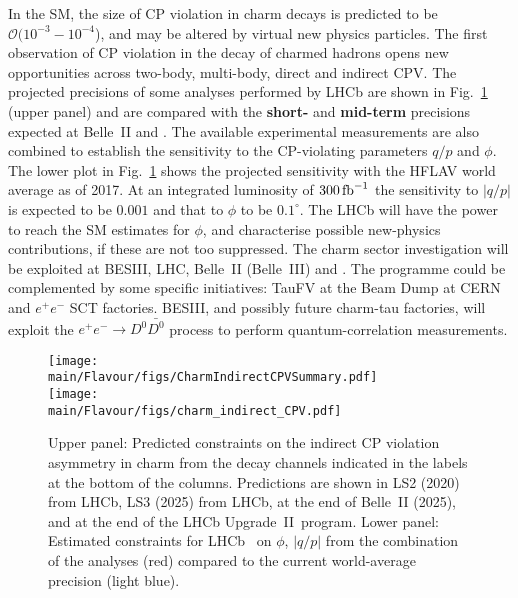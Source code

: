 In the SM, the size of CP violation in charm decays is predicted  to be $\mathcal{O} (10^{-3} -10^{-4}$), and may be altered by  virtual new physics particles. 
The first observation of CP violation in the decay of charmed hadrons \cite{Aaij:2019kcg}
opens new opportunities across two-body, multi-body, direct and indirect CPV. The projected precisions of some analyses performed by LHCb are shown in   Fig.~\ref{fig:charm_indirect_channels} (upper panel) and are compared with the {\bf short-} and {\bf mid-term} precisions expected at Belle~II and \HLLHC. 
The available experimental measurements are also combined to establish the sensitivity to the CP-violating parameters $q/p$ and $\phi$. 
The lower plot in Fig.~\ref{fig:charm_indirect_channels}  shows the projected sensitivity with the HFLAV world average as of 2017.
At an integrated luminosity of $300\mbox{\,fb}^{-1}$ the sensitivity to $|q/p|$ is expected to be $0.001$ and that to $\phi$ to be $0.1^\circ$.
The LHCb \upgradetwo will have the power to reach the SM estimates for $\phi$, and characterise possible new-physics contributions, if these are not too suppressed.
The charm sector investigation will be  exploited at BESIII, LHC, Belle~II (Belle~III) and \HLLHC. The programme could be complemented by some specific initiatives: TauFV at the Beam Dump at CERN \cite{TauFV_input} and $e^+e^-$ SCT factories. 
BESIII, and possibly future charm-tau factories, will exploit the $e^+e^- \to D^0 \bar {D^0}$ process to perform quantum-correlation measurements.
\begin{figure}
  \centering
  \texttt{[image: \\main/Flavour/figs/CharmIndirectCPVSummary.pdf]}\vspace*{3mm}\\
 \texttt{[image: \\main/Flavour/figs/charm\_indirect\_CPV.pdf]} 
  \caption{Upper panel: Predicted constraints on the indirect CP violation
    asymmetry in
    charm from the decay channels indicated in the labels at the
    bottom of the columns. Predictions are shown in LS2
    (2020) from LHCb, LS3 (2025) from LHCb, at the end of Belle~II (2025), and at the end
    of the \HLLHC LHCb Upgrade~II\ program.
    Lower panel: Estimated constraints for LHCb \upgradetwo\ on $\phi$, $|q/p|$ from the combination of the analyses (red) compared to the current world-average precision (light blue).} 
\label{fig:charm_indirect_channels}
\end{figure}

